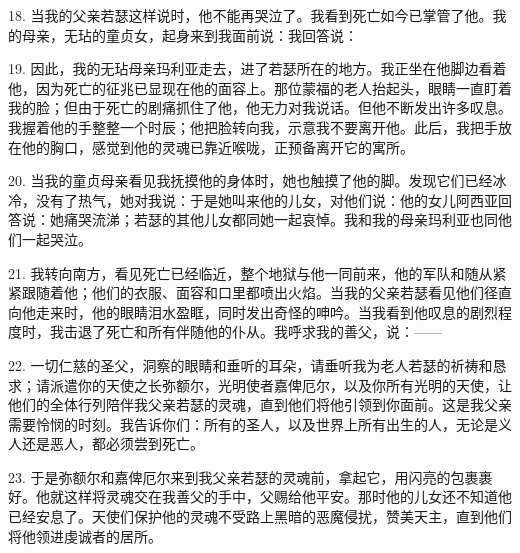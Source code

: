18. 当我的父亲若瑟这样说时，他不能再哭泣了。我看到死亡如今已掌管了他。我的母亲，无玷的童贞女，起身来到我面前说：我回答说：\par

19. 因此，我的无玷母亲玛利亚走去，进了若瑟所在的地方。我正坐在他脚边看着他，因为死亡的征兆已显现在他的面容上。那位蒙福的老人抬起头，眼睛一直盯着我的脸；但由于死亡的剧痛抓住了他，他无力对我说话。但他不断发出许多叹息。我握着他的手整整一个时辰；他把脸转向我，示意我不要离开他。此后，我把手放在他的胸口，感觉到他的灵魂已靠近喉咙，正预备离开它的寓所。\par

20. 当我的童贞母亲看见我抚摸他的身体时，她也触摸了他的脚。发现它们已经冰冷，没有了热气，她对我说：于是她叫来他的儿女，对他们说：他的女儿阿西亚回答说：她痛哭流涕；若瑟的其他儿女都同她一起哀悼。我和我的母亲玛利亚也同他们一起哭泣。\par

21. 我转向南方，看见死亡已经临近，整个地狱与他一同前来，他的军队和随从紧紧跟随着他；他们的衣服、面容和口里都喷出火焰。当我的父亲若瑟看见他们径直向他走来时，他的眼睛泪水盈眶，同时发出奇怪的呻吟。当我看到他叹息的剧烈程度时，我击退了死亡和所有伴随他的仆从。我呼求我的善父，说：——\par

22. 一切仁慈的圣父，洞察的眼睛和垂听的耳朵，请垂听我为老人若瑟的祈祷和恳求；请派遣你的天使之长弥额尔，光明使者嘉俾厄尔，以及你所有光明的天使，让他们的全体行列陪伴我父亲若瑟的灵魂，直到他们将他引领到你面前。这是我父亲需要怜悯的时刻。我告诉你们：所有的圣人，以及世界上所有出生的人，无论是义人还是恶人，都必须尝到死亡。\par

23. 于是弥额尔和嘉俾厄尔来到我父亲若瑟的灵魂前，拿起它，用闪亮的包裹裹好。他就这样将灵魂交在我善父的手中，父赐给他平安。那时他的儿女还不知道他已经安息了。天使们保护他的灵魂不受路上黑暗的恶魔侵扰，赞美天主，直到他们将他领进虔诚者的居所。\par

